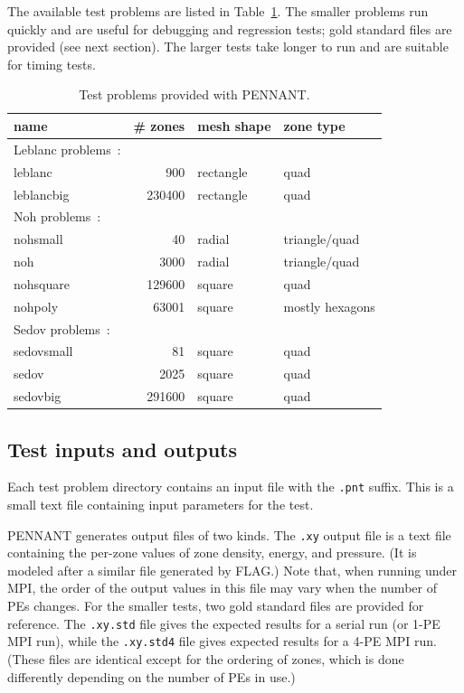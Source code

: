 \documentclass[11pt,letterpaper]{article}
\begin{document}
The available test problems are listed in Table~\ref{tbl:tests}.
The smaller problems run quickly and are useful for debugging and
regression tests; gold standard files are provided (see next section).
The larger tests take longer to run and are suitable for timing tests.

\begin{table}
\centering
\caption{Test problems provided with PENNANT.}
\label{tbl:tests}
\begin{tabular}{lrll}
    \hline
    name & \# zones & mesh shape & zone type \\
    \hline
    Leblanc problems~\cite{leblanc}: \\
    leblanc    &    900 & rectangle & quad \\
    leblancbig & 230400 & rectangle & quad \\
    \hline
    Noh problems~\cite{noh}: \\
    nohsmall   &     40 & radial    & triangle/quad \\
    noh        &   3000 & radial    & triangle/quad \\
    nohsquare  & 129600 & square    & quad \\
    nohpoly    &  63001 & square    & mostly hexagons \\
    \hline
    Sedov problems~\cite{sedov}: \\
    sedovsmall &     81 & square    & quad \\
    sedov      &   2025 & square    & quad \\
    sedovbig   & 291600 & square    & quad \\
    \hline
\end{tabular}
\end{table}

\subsection{Test inputs and outputs}

Each test problem directory contains an input file with the {\tt.pnt}
suffix.  This is a small text file containing input parameters for the
test.

PENNANT generates output files of two kinds.  The {\tt.xy} output file
is a text file containing the per-zone values of zone density, energy,
and pressure.  (It is modeled after a similar file generated by FLAG.)
Note that, when running under MPI, the order of the output values in
this file may vary when the number of PEs changes.
For the smaller tests, two gold standard files are provided for reference.
The {\tt.xy.std} file gives the expected results for a serial run (or
1-PE MPI run), while the {\tt.xy.std4} file gives expected results for
a 4-PE MPI run.  (These files are identical except for the ordering of
zones, which is done differently depending on the number of PEs in use.)
\end{document}
